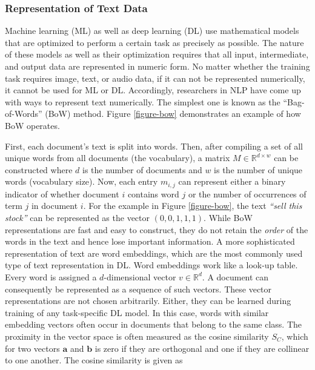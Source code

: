 \subsubsection{Representation of Text Data}
\label{section-text-repr-theory}
Machine learning (ML) as well as deep learning (DL) use mathematical models that are optimized to perform a certain task as precisely as possible. The nature of these models as well as their optimization requires that all input, intermediate, and output data are represented in numeric form. No matter whether the training task requires image, text, or audio data, if it can not be represented numerically, it cannot be used for ML or DL. Accordingly, researchers in NLP have come up with ways to represent text numerically. The simplest one is known as the ``Bag-of-Words'' (BoW) method. Figure \ref{figure-bow} demonstrates an example of how BoW operates.



 First, each document's text is split into words. Then, after compiling a set of all unique words from all documents (the vocabulary), a matrix $M \in \mathbb{R}^{d \times w}$ can be constructed where $d$ is the number of documents and $w$ is the number of unique words (vocabulary size). Now, each entry $m_{i,j}$ can represent either a binary indicator of whether document $i$ contains word $j$ or the number of occurrences of term $j$ in document $i$. For the example in Figure \ref{figure-bow}, the text \emph{``sell this stock''} can be represented as the vector $(0,0,1,1,1)$. While BoW representations are fast and easy to construct, they do not retain the \emph{order} of the words in the text and hence lose important information. \newline
 A more sophisticated representation of text are word embeddings, which are the most commonly used type of text representation in DL. Word embeddings work like a look-up table. Every word is assigned a $d$-dimensional vector $v \in \mathbb{R}^{d}$. A document can consequently be represented as a sequence of such vectors. These vector representations are not chosen arbitrarily. Either, they can be learned during training of any task-specific DL model. In this case, words with similar embedding vectors often occur in documents that belong to the same class. The proximity in the vector space is often measured as the cosine similarity $S_C$, which for two vectors $\bm{a}$ and $\bm{b}$ is zero if they are orthogonal and one if they are collinear to one another. The cosine similarity is given as

